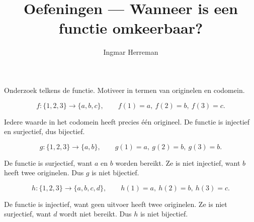 \documentclass{ximera}
\title{Oefeningen — Wanneer is een functie omkeerbaar?}
\author{Ingmar Herreman}
\begin{document}









\maketitle
\FVDbeginExercises


\begin{oefening}{\oefB\ESS}

Onderzoek telkens de functie. Motiveer in termen van originelen en codomein.

\begin{question}
\[
f:\{1,2,3\}\to\{a,b,c\},
\qquad
f(1)=a,\ f(2)=b,\ f(3)=c.
\]

\begin{oplossing}
Iedere waarde in het codomein heeft precies één origineel.
De functie is injectief en surjectief, dus bijectief.
\end{oplossing}
\end{question}

\begin{question}
\[
g:\{1,2,3\}\to\{a,b\},
\qquad
g(1)=a,\ g(2)=b,\ g(3)=b.
\]

\begin{oplossing}
De functie is surjectief, want \(a\) en \(b\) worden bereikt.
Ze is niet injectief, want \(b\) heeft twee originelen.
Dus \(g\) is niet bijectief.
\end{oplossing}
\end{question}

\begin{question}
\[
h:\{1,2,3\}\to\{a,b,c,d\},
\qquad
h(1)=a,\ h(2)=b,\ h(3)=c.
\]

\begin{oplossing}
De functie is injectief, want geen uitvoer heeft twee originelen.
Ze is niet surjectief, want \(d\) wordt niet bereikt.
Dus \(h\) is niet bijectief.
\end{oplossing}
\end{question}

\end{oefening}
\end{document}
